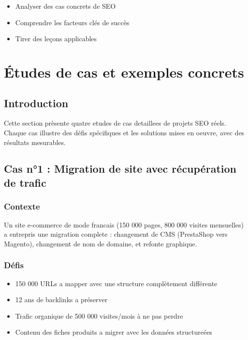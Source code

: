 \documentclass[12pt,a4paper,twoside]{report}
\newcommand{\level}[1]{\medskip\bigskip}
\begin{document}
\level{2}
\begin{objectives}
\begin{itemize}
    \item Analyser des cas concrets de SEO
    \item Comprendre les facteurs clés de succès
    \item Tirer des leçons applicables
\end{itemize}
\end{objectives}

\chapter{Études de cas et exemples concrets}
\label{ch:cas}

\section{Introduction}

Cette section prèsente quatre etudes de cas detaillees de projets SEO réels. Chaque cas illustre des défis spécifiques et les solutions mises en oeuvre, avec des résultats mesurables.

\section{Cas n°1 : Migration de site avec récupération de trafic}

\subsection{Contexte}

Un site e-commerce de mode francais (150 000 pages, 800 000 visites mensuelles) a entrepris une migration complete : changement de CMS (PrestaShop vers Magento), changement de nom de domaine, et refonte graphique.

\subsection{Défis}

\begin{itemize}
    \item 150 000 URLs a mapper avec une structure complètement différente
    \item 12 ans de backlinks a préserver
    \item Trafic organique de 500 000 visites/mois à ne pas perdre
    \item Contenu des fiches produits a migrer avec les données structureées
\end{itemize}
\end{document}
